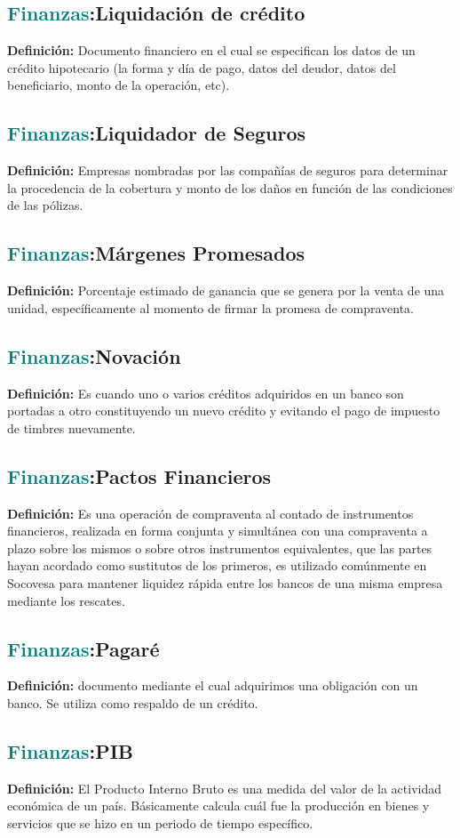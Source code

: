 \documentclass[12pt]{article}
\begin{document}
\subsection{\textcolor{teal}{Finanzas}:{Liquidación de crédito}}
\textbf{Definición:} Documento financiero en el cual se especifican los datos de un crédito hipotecario (la forma y día de pago, datos del deudor, datos del beneficiario, monto de la operación, etc).
\subsection{\textcolor{teal}{Finanzas}:{Liquidador de Seguros}}
\textbf{Definición:} Empresas nombradas por las compañías de seguros para determinar la procedencia de la cobertura y monto de los daños en función de las condiciones de las pólizas.
\subsection{\textcolor{teal}{Finanzas}:{Márgenes Promesados}}
\textbf{Definición:} Porcentaje estimado de ganancia que se genera por la venta de una unidad, específicamente al momento de firmar la promesa de compraventa.
\subsection{\textcolor{teal}{Finanzas}:{Novación}}
\textbf{Definición:} Es cuando uno o varios créditos adquiridos en un banco son portadas a otro constituyendo un nuevo crédito y evitando el pago de impuesto de timbres nuevamente.
\subsection{\textcolor{teal}{Finanzas}:{Pactos Financieros}}
\textbf{Definición:} Es una operación de compraventa al contado de instrumentos financieros, realizada en forma conjunta y simultánea con una compraventa a plazo sobre los mismos o sobre otros instrumentos equivalentes, que las partes hayan acordado como sustitutos de los primeros, es utilizado comúnmente en Socovesa para mantener liquidez rápida entre los bancos de una misma empresa mediante los rescates.
\subsection{\textcolor{teal}{Finanzas}:{Pagaré}}
\textbf{Definición:} documento mediante el cual adquirimos una obligación con un banco. Se utiliza como respaldo de un crédito.
\subsection{\textcolor{teal}{Finanzas}:{PIB}}
\textbf{Definición:} El Producto Interno Bruto es una medida del valor de la actividad económica de un país. Básicamente calcula cuál fue la producción en bienes y servicios que se hizo en un periodo de tiempo específico.
\end{document}
